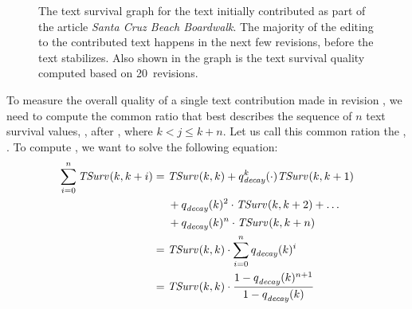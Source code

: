 \begin{figure}[tbph]
\centering
{}
\caption{The text survival graph for the text initially contributed
	as part of the article \textit{Santa Cruz Beach Boardwalk}.
	The majority of the editing to the contributed text happens
	in the next few revisions, before the text stabilizes.
	Also shown in the graph is the text survival quality
	computed based on 20~revisions.
	}
\label{fig:ts-SantaCruzBeachBoardwalk}
\end{figure}

To measure the overall quality of a single text contribution
made in revision , we need to compute the common ratio
that best describes the sequence of $n$ text survival values,
, after , where $k < j \le k+n$.
Let us call this common ration the , .
To compute , we want to solve the following equation:
\begin{align*}
    \sum_{i=0}^n \mathit{TSurv}_{}(k,k+i) = {} & \mathit{TSurv}_{}(k,k) + q_\mathit{decay}^{k}(\cdot) \mathit{TSurv}_{}(k,k+1) \\
    & + q_\mathit{decay}^{}(k)^2 \cdot \mathit{TSurv}_{}(k,k+2) + \ldots \\
    & + q_\mathit{decay}^{}(k)^n \cdot \mathit{TSurv}_{}(k,k+n) \\
    = {} & \mathit{TSurv}_{}(k,k) \cdot \sum_{i=0}^n q_\mathit{decay}^{}(k)^i \\
    = {} & \mathit{TSurv}_{}(k,k) \cdot \frac{1 - q_\mathit{decay}^{}(k)^{n+1}}{1 - q_\mathit{decay}^{}(k)} \\
\end{align*}

